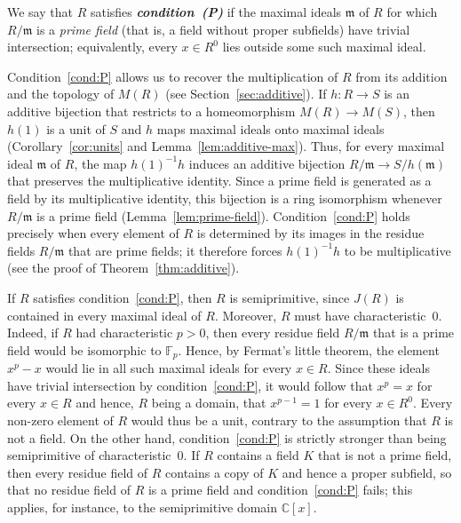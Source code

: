 \documentclass[12pt,reqno,a4paper]{amsart}
\makeatletter
\newcommand{\C}{\mathbb{C}}
\newcommand{\F}{\mathbb{F}}
\newcommand{\m}{\mathfrak{m}}
\newcommand*{\namedlabel}[2]{\begingroup\phantomsection\def\@currentlabel{#2}\label{#1}\endgroup}
\theoremstyle{plain}
\theoremstyle{definition}
\makeatother
\begin{document}
We say that $R$ satisfies \textbf{\textit{condition~(P)}}\namedlabel{cond:P}{\textup{(P)}} if the maximal ideals $\m$ of $R$ for which $R/\m$ is a \emph{prime field} (that is, a field without proper subfields) have trivial intersection; equivalently, every $x\in R^0$ lies outside some such maximal ideal.

Condition~\ref{cond:P} allows us to recover the multiplication of $R$ from its addition and the topology of $M(R)$ (see Section~\ref{sec:additive}). If $h\colon R\to S$ is an additive bijection that restricts to a homeomorphism $M(R)\to M(S)$, then $h(1)$ is a unit of $S$ and $h$ maps maximal ideals onto maximal ideals (Corollary~\ref{cor:units} and Lemma~\ref{lem:additive-max}). Thus, for every maximal ideal $\m$ of $R$, the map $h(1)^{-1}h$ induces an additive bijection $R/\m\to S/h(\m)$ that preserves the multiplicative identity. Since a prime field is generated as a field by its multiplicative identity, this bijection is a ring isomorphism whenever $R/\m$ is a prime field (Lemma~\ref{lem:prime-field}). Condition~\ref{cond:P} holds precisely when every element of $R$ is determined by its images in the residue fields $R/\m$ that are prime fields; it therefore forces $h(1)^{-1}h$ to be multiplicative (see the proof of Theorem~\ref{thm:additive}).

If $R$ satisfies condition~\ref{cond:P}, then $R$ is semiprimitive, since $J(R)$ is contained in every maximal ideal of $R$. Moreover, $R$ must have characteristic~$0$. Indeed, if $R$ had characteristic $p>0$, then every residue field $R/\m$ that is a prime field would be isomorphic to $\F_p$. Hence, by Fermat's little theorem, the element $x^p-x$ would lie in all such maximal ideals for every $x\in R$. Since these ideals have trivial intersection by condition~\ref{cond:P}, it would follow that $x^p=x$ for every $x\in R$ and hence, $R$ being a domain, that $x^{p-1}=1$ for every $x\in R^0$. Every non-zero element of $R$ would thus be a unit, contrary to the assumption that $R$ is not a field. On the other hand, condition~\ref{cond:P} is strictly stronger than being semiprimitive of characteristic~$0$. If $R$ contains a field $K$ that is not a prime field, then every residue field of $R$ contains a copy of $K$ and hence a proper subfield, so that no residue field of $R$ is a prime field and condition~\ref{cond:P} fails; this applies, for instance, to the semiprimitive domain $\C[x]$.
\end{document}
